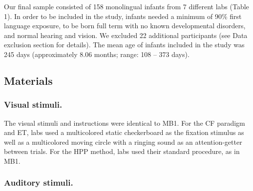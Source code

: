 \documentclass[
  man,floatsintext]{apa6}
\begin{document}
Our final sample consisted of 158 monolingual infants from 7 different labs (Table 1).
In order to be included in the study, infants needed a minimum of 90\% first language exposure, to be born full term with no known developmental disorders, and normal hearing and vision.
We excluded 22 additional participants (see Data exclusion section for details).
The mean age of infants included in the study was 245 days (approximately 8.06 months; range: 108 -- 373 days).

\hypertarget{materials}{%
\subsection{Materials}\label{materials}}

\hypertarget{visual-stimuli.}{%
\subsubsection{Visual stimuli.}\label{visual-stimuli.}}

The visual stimuli and instructions were identical to MB1.
For the CF paradigm and ET, labs used a multicolored static checkerboard as the fixation stimulus as well as a multicolored moving circle with a ringing sound as an attention-getter between trials.
For the HPP method, labs used their standard procedure, as in MB1.

\hypertarget{auditory-stimuli.}{%
\subsubsection{Auditory stimuli.}\label{auditory-stimuli.}}
\end{document}
